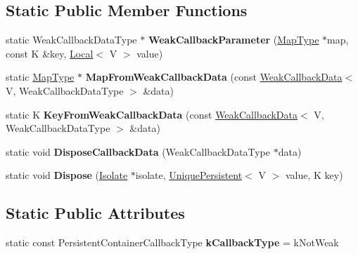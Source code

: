 \subsection*{Static Public Member Functions}
\begin{DoxyCompactItemize}
\item 
\hypertarget{classv8_1_1DefaultPersistentValueMapTraits_a63b6fc80207ce6ac7d1eaa306b68768c}{}static Weak\+Callback\+Data\+Type $\ast$ {\bfseries Weak\+Callback\+Parameter} (\hyperlink{classv8_1_1PersistentValueMap}{Map\+Type} $\ast$map, const K \&key, \hyperlink{classv8_1_1Local}{Local}$<$ V $>$ value)\label{classv8_1_1DefaultPersistentValueMapTraits_a63b6fc80207ce6ac7d1eaa306b68768c}

\item 
\hypertarget{classv8_1_1DefaultPersistentValueMapTraits_a721a7a6624ffe207af1adee6d6be2fe3}{}static \hyperlink{classv8_1_1PersistentValueMap}{Map\+Type} $\ast$ {\bfseries Map\+From\+Weak\+Callback\+Data} (const \hyperlink{classv8_1_1WeakCallbackData}{Weak\+Callback\+Data}$<$ V, Weak\+Callback\+Data\+Type $>$ \&data)\label{classv8_1_1DefaultPersistentValueMapTraits_a721a7a6624ffe207af1adee6d6be2fe3}

\item 
\hypertarget{classv8_1_1DefaultPersistentValueMapTraits_ac85c6254f23d246d78a84721a80babae}{}static K {\bfseries Key\+From\+Weak\+Callback\+Data} (const \hyperlink{classv8_1_1WeakCallbackData}{Weak\+Callback\+Data}$<$ V, Weak\+Callback\+Data\+Type $>$ \&data)\label{classv8_1_1DefaultPersistentValueMapTraits_ac85c6254f23d246d78a84721a80babae}

\item 
\hypertarget{classv8_1_1DefaultPersistentValueMapTraits_a9e5c3a4a054b13f46065adec2c44ddfe}{}static void {\bfseries Dispose\+Callback\+Data} (Weak\+Callback\+Data\+Type $\ast$data)\label{classv8_1_1DefaultPersistentValueMapTraits_a9e5c3a4a054b13f46065adec2c44ddfe}

\item 
\hypertarget{classv8_1_1DefaultPersistentValueMapTraits_ad3c76fc7b1dd8168a69613577e83489d}{}static void {\bfseries Dispose} (\hyperlink{classv8_1_1Isolate}{Isolate} $\ast$isolate, \hyperlink{classv8_1_1UniquePersistent}{Unique\+Persistent}$<$ V $>$ value, K key)\label{classv8_1_1DefaultPersistentValueMapTraits_ad3c76fc7b1dd8168a69613577e83489d}

\end{DoxyCompactItemize}
\subsection*{Static Public Attributes}
\begin{DoxyCompactItemize}
\item 
\hypertarget{classv8_1_1DefaultPersistentValueMapTraits_a1f57d8246e4ace68bc9be1047eb7cc40}{}static const Persistent\+Container\+Callback\+Type {\bfseries k\+Callback\+Type} = k\+Not\+Weak\label{classv8_1_1DefaultPersistentValueMapTraits_a1f57d8246e4ace68bc9be1047eb7cc40}

\end{DoxyCompactItemize}


